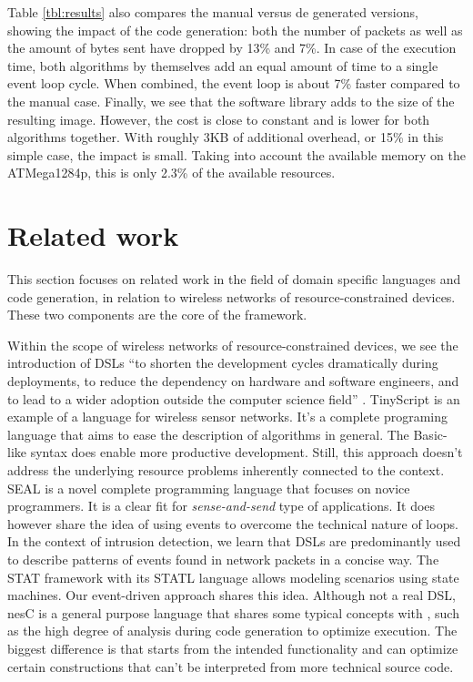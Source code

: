\documentclass[3p,times,procedia]{elsarticle}
\begin{document}
Table \ref{tbl:results} also compares the manual versus de generated versions,
showing the impact of the code generation: both the number of packets as well
as the amount of bytes sent have dropped by 13\% and 7\%. In case of the
execution time, both algorithms by themselves add an equal amount of time to a
single event loop cycle. When combined, the event loop is about 7\% faster
compared to the manual case. Finally, we see that the software library adds to
the size of the resulting image. However, the cost is close to constant and is
lower for both algorithms together. With roughly 3KB of additional overhead, or
15\% in this simple case, the impact is small. Taking into account the
available memory on the ATMega1284p, this is only 2.3\% of the available
resources.

\section{Related work}
\label{related}

This section focuses on related work in the field of domain specific languages
and code generation, in relation to wireless networks of resource-constrained
devices. These two components are the core of the \FOO framework.

Within the scope of wireless networks of resource-constrained devices, we see
the introduction of DSLs \enquote{to shorten the development cycles
dramatically during deployments, to reduce the dependency on hardware and
software engineers, and to lead to a wider adoption outside the computer
science field} \cite{sadilek2008domain}. TinyScript \cite{levis2004tinyscript}
is an example of a language for wireless sensor networks. It's a complete
programing language that aims to ease the description of algorithms in general.
The Basic-like syntax does enable more productive development. Still, this
approach doesn't address the underlying resource problems inherently connected
to the context. SEAL \cite{elsts2013seal} is a novel complete programming
language that focuses on novice programmers. It is a clear fit for
\emph{sense-and-send} type of applications. It does however share the idea of
using events to overcome the technical nature of loops. In the context of
intrusion detection, we learn that DSLs are predominantly used to describe
patterns of events found in network packets
\cite{sekar1999high,roesch1999snort} in a concise way. The STAT framework with
its STATL language \cite{eckmann2002statl,vigna2003designing} allows modeling
scenarios using state machines. Our event-driven approach shares this idea.
Although not a real DSL, nesC \cite{gay2003nesc} is a general purpose language
that shares some typical concepts with \FOO, such as the high degree of
analysis during code generation to optimize execution. The biggest difference
is that \FOO starts from the intended functionality and can optimize certain
constructions that can't be interpreted from more technical source code.
\end{document}
